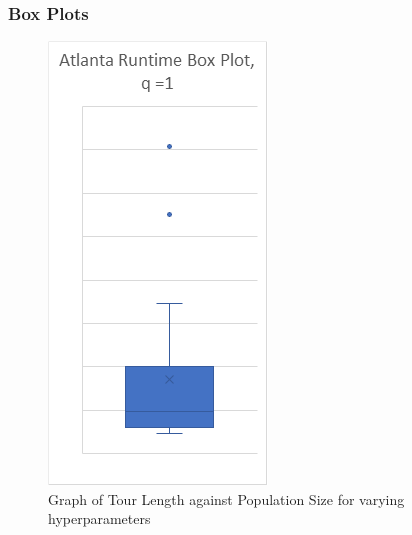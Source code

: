 \documentclass[sigconf]{acmart}
\begin{document}
\subsubsection{Box Plots}
\begin{figure}[h]
  \centering
  \includegraphics[width=\linewidth=]{genetic_box_Atlanta.png}
  \caption{Graph of Tour Length against Population Size for varying hyperparameters}
\end{figure}
\end{document}
